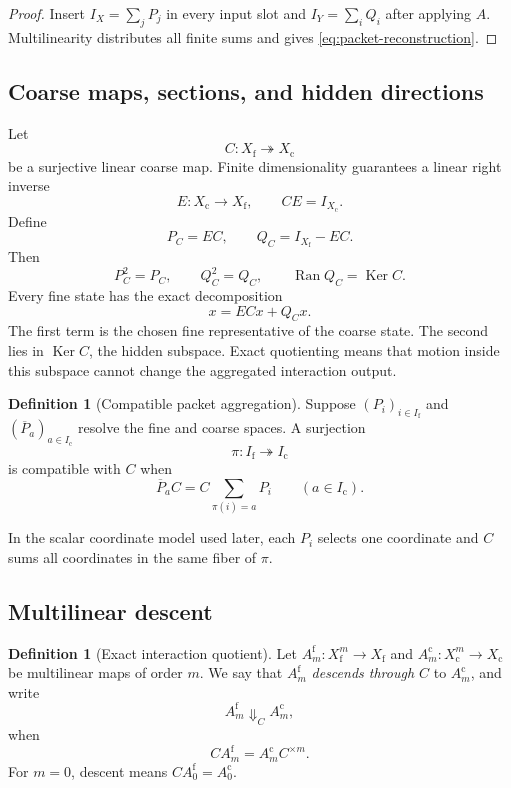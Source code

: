\documentclass[11pt]{article}
\theoremstyle{definition}
\newtheorem{definition}[theorem]{Definition}
\theoremstyle{remark}
\newcommand{\Ran}{\operatorname{Ran}}
\newcommand{\Ker}{\operatorname{Ker}}
\newcommand{\fine}{\mathrm f}
\newcommand{\coarse}{\mathrm c}
\begin{document}
\begin{proof}
Insert $I_X=\sum_jP_j$ in every input slot and $I_Y=\sum_iQ_i$ after applying $A$.  Multilinearity distributes all finite sums and gives \eqref{eq:packet-reconstruction}.
\end{proof}

\subsection{Coarse maps, sections, and hidden directions}
Let
\[
  C:X_{\fine}\twoheadrightarrow X_{\coarse}
\]
be a surjective linear coarse map.  Finite dimensionality guarantees a linear right inverse
\[
  E:X_{\coarse}\to X_{\fine},
  \qquad CE=I_{X_{\coarse}}.
\]
Define
\begin{equation}\label{eq:representative-hidden-proj}
  P_C=EC,
  \qquad
  Q_C=I_{X_{\fine}}-EC.
\end{equation}
Then
\[
  P_C^2=P_C,
  \qquad
  Q_C^2=Q_C,
  \qquad
  \Ran Q_C=\Ker C.
\]
Every fine state has the exact decomposition
\begin{equation}\label{eq:representative-hidden-decomposition}
  x=ECx+Q_Cx.
\end{equation}
The first term is the chosen fine representative of the coarse state.  The second lies in $\Ker C$, the hidden subspace.  Exact quotienting means that motion inside this subspace cannot change the aggregated interaction output.

\begin{definition}[Compatible packet aggregation]\label{def:packet-aggregation}
Suppose $(P_i)_{i\in I_{\fine}}$ and $(\overline P_a)_{a\in I_{\coarse}}$ resolve the fine and coarse spaces.  A surjection
\[
  \pi:I_{\fine}\twoheadrightarrow I_{\coarse}
\]
is compatible with $C$ when
\begin{equation}\label{eq:packet-aggregation-compatibility}
  \overline P_aC
  =
  C\sum_{\pi(i)=a}P_i
  \qquad(a\in I_{\coarse}).
\end{equation}
\end{definition}

In the scalar coordinate model used later, each $P_i$ selects one coordinate and $C$ sums all coordinates in the same fiber of $\pi$.

\subsection{Multilinear descent}

\begin{definition}[Exact interaction quotient]\label{def:exact-interaction-quotient}
Let $A_m^{\fine}:X_{\fine}^m\to X_{\fine}$ and $A_m^{\coarse}:X_{\coarse}^m\to X_{\coarse}$ be multilinear maps of order $m$.  We say that $A_m^{\fine}$ \emph{descends through $C$} to $A_m^{\coarse}$, and write
\[
  A_m^{\fine}\Downarrow_C A_m^{\coarse},
\]
when
\begin{equation}\label{eq:exact-interaction-quotient}
  C A_m^{\fine}
  =
  A_m^{\coarse}C^{\times m}.
\end{equation}
For $m=0$, descent means $CA_0^{\fine}=A_0^{\coarse}$.
\end{definition}
\end{document}
